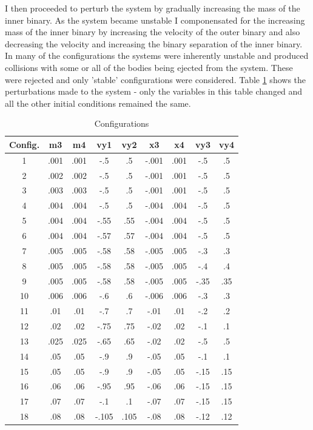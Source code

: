 \documentclass[a4paper,12pt]{article}
\begin{document}
I then proceeded to perturb the system by gradually increasing the mass of the inner binary. As the system became unstable I componensated for
the increasing mass of the inner binary by increasing the velocity of the outer binary and also decreasing the velocity and increasing the binary 
separation of the inner binary. In many of the configurations the systems were inherently unstable and produced collisions with some 
or all of the bodies being ejected from the system. These were rejected and only 'stable' configurations were considered.
Table \ref{tab:variables} shows the perturbations made to the system - only the variables in this table changed and all the other initial
conditions remained the same.
\begin{table}[ht!]
  \centering
  \caption{Configurations}
  \label{tab:variables}
  \begin{tabular}{ccccccccc}
   Config. & m3 & m4 & vy1 & vy2 & x3 & x4 & vy3 & vy4\\
    \hline
   1 & .001 & .001 & -.5 & .5 & -.001 & .001 & -.5 & .5\\
   2 & .002 & .002 & -.5 & .5 & -.001 & .001 & -.5 & .5\\
   3 & .003 & .003 & -.5 & .5 & -.001 & .001 & -.5 & .5\\
   4 & .004 & .004 & -.5 & .5 & -.004 & .004 & -.5 & .5\\
   5 & .004 & .004 & -.55 & .55 & -.004 & .004 & -.5 & .5\\
   6 & .004 & .004 & -.57 & .57 & -.004 & .004 & -.5 & .5\\
   7 & .005 & .005 & -.58 & .58 & -.005 & .005 & -.3 & .3\\
   8 & .005 & .005 & -.58 & .58 & -.005 & .005 & -.4 & .4\\
   9 & .005 & .005 & -.58 & .58 & -.005 & .005 & -.35 & .35\\
   10 & .006 & .006 & -.6 & .6 & -.006 & .006 & -.3 & .3\\
   11 & .01 & .01 & -.7 & .7 & -.01 & .01 & -.2 & .2\\
   12 & .02 & .02 & -.75 & .75 & -.02 & .02 & -.1 & .1\\
   13 & .025 & .025 & -.65 & .65 & -.02 & .02 & -.5 & .5\\
   14 & .05 & .05 & -.9 & .9 & -.05 & .05 & -.1 & .1\\
   15 & .05 & .05 & -.9 & .9 & -.05 & .05 & -.15 & .15\\
   16 & .06 & .06 & -.95 & .95 & -.06 & .06 & -.15 & .15\\
   17 & .07 & .07 & -.1 & .1 & -.07 & .07 & -.15 & .15\\
   18 & .08 & .08 & -.105 & .105 & -.08 & .08 & -.12 & .12\\
  \end{tabular}
\end{table}
\end{document}
